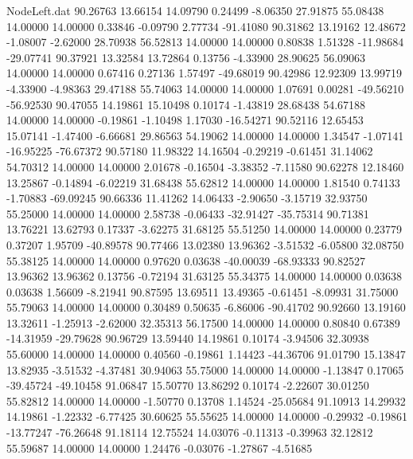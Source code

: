 \begin{filecontents}{NodeLeft.dat}
  90.26763   13.66154   14.09790     0.24499   -8.06350   27.91875   55.08438   14.00000   14.00000    0.33846   -0.09790    2.77734  -91.41080
  90.31862   13.19162   12.48672    -1.08007   -2.62000   28.70938   56.52813   14.00000   14.00000    0.80838    1.51328  -11.98684  -29.07741
  90.37921   13.32584   13.72864     0.13756   -4.33900   28.90625   56.09063   14.00000   14.00000    0.67416    0.27136    1.57497  -49.68019
  90.42986   12.92309   13.99719    -4.33900   -4.98363   29.47188   55.74063   14.00000   14.00000    1.07691    0.00281  -49.56210  -56.92530
  90.47055   14.19861   15.10498     0.10174   -1.43819   28.68438   54.67188   14.00000   14.00000   -0.19861   -1.10498    1.17030  -16.54271
  90.52116   12.65453   15.07141    -1.47400   -6.66681   29.86563   54.19062   14.00000   14.00000    1.34547   -1.07141  -16.95225  -76.67372
  90.57180   11.98322   14.16504    -0.29219   -0.61451   31.14062   54.70312   14.00000   14.00000    2.01678   -0.16504   -3.38352   -7.11580
  90.62278   12.18460   13.25867    -0.14894   -6.02219   31.68438   55.62812   14.00000   14.00000    1.81540    0.74133   -1.70883  -69.09245
  90.66336   11.41262   14.06433    -2.90650   -3.15719   32.93750   55.25000   14.00000   14.00000    2.58738   -0.06433  -32.91427  -35.75314
  90.71381   13.76221   13.62793     0.17337   -3.62275   31.68125   55.51250   14.00000   14.00000    0.23779    0.37207    1.95709  -40.89578
  90.77466   13.02380   13.96362    -3.51532   -6.05800   32.08750   55.38125   14.00000   14.00000    0.97620    0.03638  -40.00039  -68.93333
  90.82527   13.96362   13.96362     0.13756   -0.72194   31.63125   55.34375   14.00000   14.00000    0.03638    0.03638    1.56609   -8.21941
  90.87595   13.69511   13.49365    -0.61451   -8.09931   31.75000   55.79063   14.00000   14.00000    0.30489    0.50635   -6.86006  -90.41702
  90.92660   13.19160   13.32611    -1.25913   -2.62000   32.35313   56.17500   14.00000   14.00000    0.80840    0.67389  -14.31959  -29.79628
  90.96729   13.59440   14.19861     0.10174   -3.94506   32.30938   55.60000   14.00000   14.00000    0.40560   -0.19861    1.14423  -44.36706
  91.01790   15.13847   13.82935    -3.51532   -4.37481   30.94063   55.75000   14.00000   14.00000   -1.13847    0.17065  -39.45724  -49.10458
  91.06847   15.50770   13.86292     0.10174   -2.22607   30.01250   55.82812   14.00000   14.00000   -1.50770    0.13708    1.14524  -25.05684
  91.10913   14.29932   14.19861    -1.22332   -6.77425   30.60625   55.55625   14.00000   14.00000   -0.29932   -0.19861  -13.77247  -76.26648
  91.18114   12.75524   14.03076    -0.11313   -0.39963   32.12812   55.59687   14.00000   14.00000    1.24476   -0.03076   -1.27867   -4.51685

\end{filecontents}
